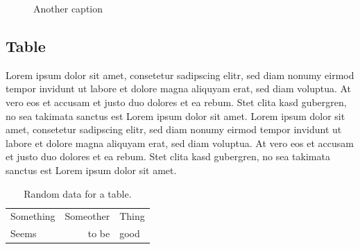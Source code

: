\begin{figure}[!ht]

\caption{Another caption}
\label{fig:Pict2}
\end{figure}



\subsection{Table}
Lorem ipsum dolor sit amet, consetetur sadipscing elitr, sed diam nonumy eirmod tempor invidunt ut labore et dolore magna aliquyam erat, sed diam voluptua. At vero eos et accusam et justo duo dolores et ea rebum. Stet clita kasd gubergren, no sea takimata sanctus est Lorem ipsum dolor sit amet. Lorem ipsum dolor sit amet, consetetur sadipscing elitr, sed diam nonumy eirmod tempor invidunt ut labore et dolore magna aliquyam erat, sed diam voluptua. At vero eos et accusam et justo duo dolores et ea rebum. Stet clita kasd gubergren, no sea takimata sanctus est Lorem ipsum dolor sit amet.
\begin{table}[!ht]
	\centering
	\begin{tabular}{|l|rl|}
		\hline
		Something & Someother & Thing \\
  		Seems & to be & good\\
  		\hline
  	\end{tabular}
  	\caption{Random data for a table.}
\end{table}

